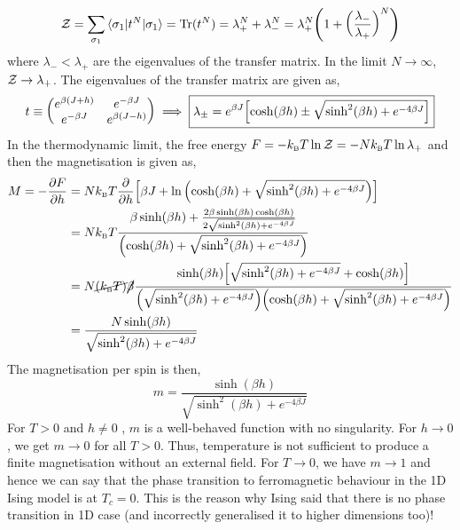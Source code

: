 $$\mathcal Z = \sum_{\sigma_1}\braket{\sigma_1|t^N|\sigma_1} = \mathrm{Tr}(t^N) = \lambda_+^N+\lambda^N_- = \lambda_+^N\qty(1+\qty(\frac{\lambda_-}{\lambda_+})^N)$$
where $\lambda_-<\lambda_+$ are the eigenvalues of the transfer matrix. In the limit $N\to\infty$, $\mathcal Z\to \lambda_+$. The eigenvalues of the transfer matrix are given as, 
\begin{align*}
    t\equiv \mqty(e^{\beta(J+h)} & e^{-\beta J} \\ e^{-\beta J} & e^{\beta(J-h)}) \implies \boxed{\lambda_{\pm} = e^{\beta J}\qty[\cosh(\beta h) \pm \sqrt{\sinh^2(\beta h) + e^{-4\beta J}}]}
\end{align*}
In the thermodynamic limit, the free energy $F= -k_{\text{\tiny B}} T \ln \mathcal Z = -Nk_{\text{\tiny B}} T\ln \lambda_+$ and then the magnetisation is given as,
\begin{align*}
    M = -\pdv{F}{h} &= Nk_{\text{\tiny B}} T\pdv{h} \qty[\beta J +\ln\qty(\cosh(\beta h) + \sqrt{\sinh^2(\beta h) + e^{-4\beta J}})] \\
    &=Nk_{\text{\tiny B}} T \frac{\beta \sinh(\beta h) + \frac{2\beta\sinh(\beta h)\cosh(\beta h)}{2\sqrt{\sinh^2(\beta h) + e^{-4\beta J}}}}{\qty(\cosh(\beta h) + \sqrt{\sinh^2(\beta h) + e^{-4\beta J}})}\\
    &=N\cancel{(k_{\text{\tiny B}} T)}\cancel{\beta }\frac{\sinh(\beta h)\qty[\sqrt{\sinh^2(\beta h) + e^{-4\beta J}}+\cosh(\beta h)]}{\qty( \sqrt{\sinh^2(\beta h) + e^{-4\beta J}})\qty(\cosh(\beta h) + \sqrt{\sinh^2(\beta h) + e^{-4\beta J}})}\\
    &=\frac{N\sinh(\beta h)}{ \sqrt{\sinh^2(\beta h) + e^{-4\beta J}}}
\end{align*}
The magnetisation per spin is then,
$$\boxed{m = \frac{\sinh(\beta h)}{ \sqrt{\sinh^2(\beta h) + e^{-4\beta J}}}}$$
For $T>0$ and $h\neq 0$ , $m$ is a well-behaved function with no singularity. For $h\to 0$, we get $m\to 0$ for all $T>0$. Thus, temperature is not sufficient to produce a finite magnetisation without an external field. For $T\to 0$, we have $m \to 1$ and hence we can say that the phase transition to ferromagnetic behaviour in the 1D Ising model is at $T_c=0$. This is the reason why Ising said that there is no phase transition in 1D case (and incorrectly generalised it to higher dimensions too)!